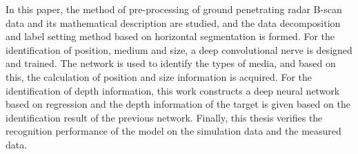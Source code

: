 \begin{englishabstract}
	In this paper, the method of pre-processing of ground penetrating radar B-scan data and its mathematical description are studied, and the data decomposition and label setting method based on horizontal segmentation is formed. For the identification of position, medium and size, a deep convolutional nerve is designed and trained. The network is used to identify the types of media, and based on this, the calculation of position and size information is acquired. For the identification of depth information, this work constructs a deep neural network based on regression and the depth information of the target is given based on the identification result of the previous network. Finally, this thesis verifies the recognition performance of the model on the simulation data and the measured data.
	
\end{englishabstract}


